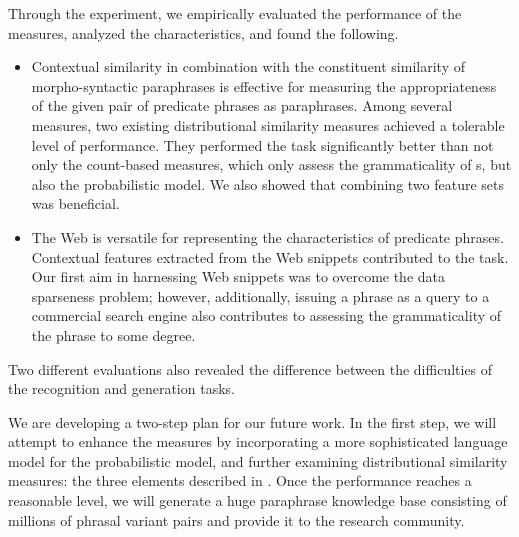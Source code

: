 \documentclass[english]{jnlp_1.4}
\begin{document}
Through the experiment, we empirically evaluated the performance of
the measures, analyzed the characteristics, and found the following.
\begin{itemize}
\item Contextual similarity in combination with the constituent
  similarity of morpho-syntactic paraphrases is effective for
  measuring the appropriateness of the given pair of predicate phrases
  as paraphrases.  Among several measures, two existing distributional
  similarity measures achieved a tolerable level of performance.  They
  performed the task significantly better than not only the
  count-based measures, which only assess the grammaticality of
  {\pc}s, but also the probabilistic model.  We also showed that
  combining two feature sets was beneficial.
\item The Web is versatile for representing the characteristics of
  predicate phrases.  Contextual features extracted from the Web
  snippets contributed to the task.  Our first aim in harnessing Web
  snippets was to overcome the data sparseness problem; however,
  additionally, issuing a phrase as a query to a commercial search
  engine also contributes to assessing the grammaticality of the
  phrase to some degree.
\end{itemize}
Two different evaluations also revealed the difference between the
difficulties of the recognition and generation tasks.

We are developing a two-step plan for our future work.
In the first step, we will attempt to enhance the measures by
incorporating a more sophisticated language model for the
probabilistic model, and further examining distributional similarity
measures: the three elements described in .
Once the performance reaches a reasonable level, we will generate a
huge paraphrase knowledge base consisting of millions of phrasal
variant pairs and provide it to the research community.
\end{document}
